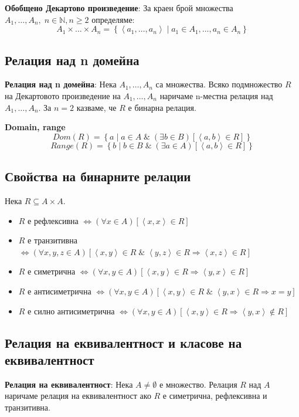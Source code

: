 \documentclass{article}
\renewcommand{\\}{\newline}
\newcommand{\amp}{\;\&\;}
\newcommand{\sep}{\;|\;}
\begin{document}
    \textbf{Обобщено Декартово произведение}: За краен брой множества \(A_1, \dots, A_n,\; n \in \mathbb{N}, n \geq 2\) определяме: \[
    A_1 \times ... \times A_n = \left\{\left\langle a_1, \dots, a_n \right\rangle \sep a_1 \in A_1, \dots, a_n \in A_n \right\}
    \]  

    \subsection{Релация над n домейна }
    \textbf{Релация над n домейна}: Нека \(A_1,\dots,A_n\) са множества. Всяко подмножество \(R\) на Декартовото произведение на \(A_1,\dots,A_n\) наричаме n-местна релация над \(A_1,\dots,A_n\). За \(n=2\) казваме, че \(R\) е бинарна релация. 

    \textbf{Domain, range}
      \[
        Dom(R)=\left\{a\sep a \in A \amp (\exists b \in B)[\left\langle a, b\right\rangle \in R]\right\}
      \]
      \[
        Range(R)=\left\{b\sep b \in B \amp (\exists a \in A)[\left\langle a, b\right\rangle \in R]\right\}
      \]      

      \subsection{Свойства на бинарните релации }
    Нека \(R \subseteq A \times A\). 
    \begin{itemize}
      \item \(R\) е рефлексивна  \(\iff \left(\forall x \in A\right)[\left\langle x, x\right\rangle \in R]\)   
      \item \(R\) е транзитивна  \(\iff \left(\forall x, y, z \in A\right)[\left\langle x, y\right\rangle \in R \amp \left\langle y, z\right\rangle \in R \Rightarrow \left\langle x, z\right\rangle \in R]\)   
      \item \(R\) е симетрична  \(\iff \left(\forall x, y \in A\right)[\left\langle x, y\right\rangle \in R \Rightarrow \left\langle y, x\right\rangle \in R]\)   
      \item \(R\) е антисиметрична  \(\iff \left(\forall x, y \in A\right)[\left\langle x, y\right\rangle \in R \amp \left\langle y, x\right\rangle \in R \Rightarrow x = y]\)   
      \item \(R\) е силно антисиметрична  \(\iff \left(\forall x, y \in A\right)[\left\langle x, y\right\rangle \in R \Rightarrow \left\langle y, x\right\rangle \not\in R]\)   
    \end{itemize}

    \subsection{Релация на еквивалентност и класове на еквивалентност }
    \textbf{Релация на еквивалентност}: Нека \(A \not=\emptyset\) е множество. Релация \(R\) над \(A\) наричаме релация на еквивалентност ако \(R\) е симетрична, рефлексивна и транзитивна.    
\end{document}
